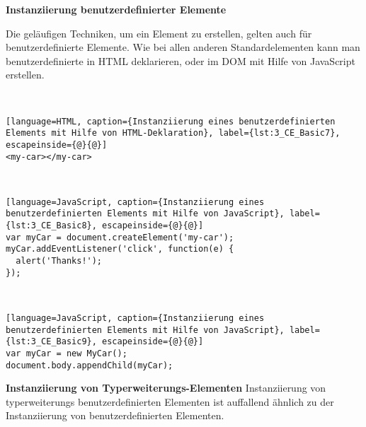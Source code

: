 \textbf{Instanziierung benutzerdefinierter Elemente}

Die geläufigen Techniken, um ein Element zu erstellen, gelten auch für benutzerdefinierte Elemente. Wie bei allen anderen Standardelementen kann man benutzerdefinierte in HTML deklarieren, oder im DOM mit Hilfe von JavaScript erstellen.

\begin{enumerate}
 \hfill \\
\begin{lstlisting}[language=HTML, caption={Instanziierung eines benutzerdefinierten Elements mit Hilfe von HTML-Deklaration}, label={lst:3_CE_Basic7}, escapeinside={@}{@}]
<my-car></my-car>
\end{lstlisting}

 \hfill \\
\begin{lstlisting}[language=JavaScript, caption={Instanziierung eines benutzerdefinierten Elements mit Hilfe von JavaScript}, label={lst:3_CE_Basic8}, escapeinside={@}{@}]
var myCar = document.createElement('my-car');
myCar.addEventListener('click', function(e) {
  alert('Thanks!');
});
\end{lstlisting}

 \hfill \\
\begin{lstlisting}[language=JavaScript, caption={Instanziierung eines benutzerdefinierten Elements mit Hilfe von JavaScript}, label={lst:3_CE_Basic9}, escapeinside={@}{@}]
var myCar = new MyCar();
document.body.appendChild(myCar);
\end{lstlisting}
\end{enumerate}

\textbf{Instanziierung von Typerweiterungs-Elementen}
Instanziierung von typerweiterungs benutzerdefinierten Elementen ist auffallend ähnlich zu der Instanziierung von benutzerdefinierten Elementen.

